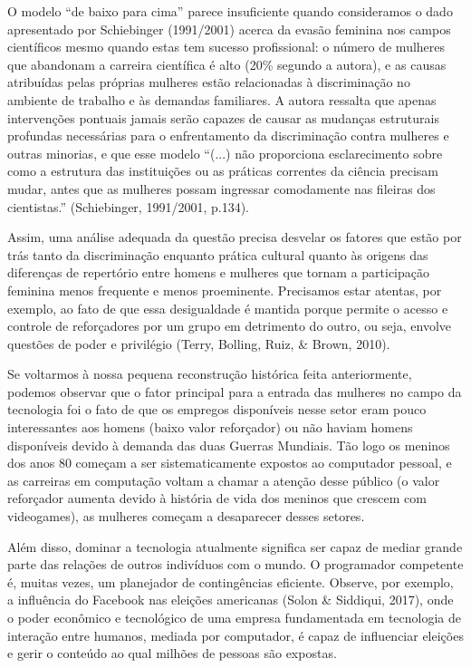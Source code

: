 O modelo “de baixo para cima” parece insuficiente quando consideramos o dado apresentado por Schiebinger (1991/2001) acerca da evasão feminina nos campos científicos mesmo quando estas tem sucesso profissional: o número de mulheres que abandonam a carreira científica é alto (20\% segundo a autora), e as causas atribuídas pelas próprias mulheres estão relacionadas à discriminação no ambiente de trabalho e às demandas familiares. A autora ressalta que apenas intervenções pontuais jamais serão capazes de causar as mudanças estruturais profundas necessárias para o enfrentamento da discriminação contra mulheres e outras minorias, e que esse modelo “(...) não proporciona esclarecimento sobre como a estrutura das instituições ou as práticas correntes da ciência precisam mudar, antes que as mulheres possam ingressar comodamente nas fileiras dos cientistas.” (Schiebinger, 1991/2001, p.134).

Assim, uma análise adequada da questão precisa desvelar os fatores que estão por trás tanto da discriminação enquanto prática cultural quanto às origens das diferenças de repertório entre homens e mulheres que tornam a participação feminina menos frequente e menos proeminente. Precisamos estar atentas, por exemplo, ao fato de que essa desigualdade é mantida porque permite o acesso e controle de reforçadores por um grupo em detrimento do outro, ou seja, envolve questões de poder e privilégio (Terry, Bolling, Ruiz, \& Brown, 2010).

Se voltarmos à nossa pequena reconstrução histórica feita anteriormente, podemos observar que o fator principal para a entrada das mulheres no campo da tecnologia foi o fato de que os empregos disponíveis nesse setor eram pouco interessantes aos homens (baixo valor reforçador) ou não haviam homens disponíveis devido à demanda das duas Guerras Mundiais. Tão logo os meninos dos anos 80 começam a ser sistematicamente expostos ao computador pessoal, e as carreiras em computação voltam a chamar a atenção desse público (o valor reforçador aumenta devido à história de vida dos meninos que crescem com videogames), as mulheres começam a desaparecer desses setores. 

Além disso, dominar a tecnologia atualmente significa ser capaz de mediar grande parte das relações de outros indivíduos com o mundo. O programador competente é, muitas vezes, um planejador de contingências eficiente. Observe, por exemplo, a influência do Facebook nas eleições americanas (Solon \& Siddiqui, 2017), onde o poder econômico e tecnológico de uma empresa fundamentada em tecnologia de interação entre humanos, mediada por computador, é capaz de influenciar eleições e gerir o conteúdo ao qual milhões de pessoas são expostas.

